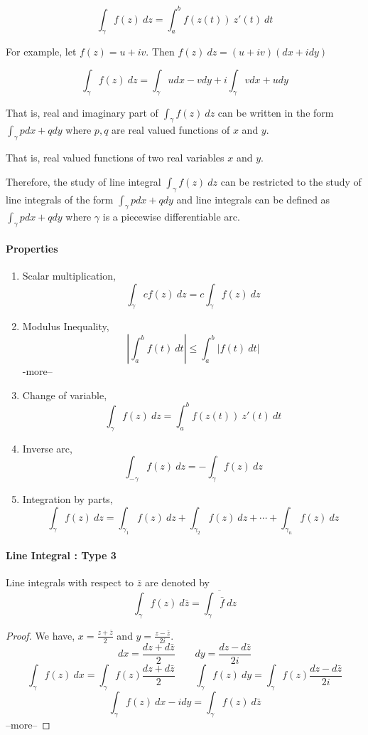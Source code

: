 \[ \int_\gamma f(z)\ dz = \int_a^b f(z(t))\ z'(t)\ dt \]

	For example, let $f(z) = u+iv$.
	Then $f(z)\ dz = (u+iv)(dx+idy)$

\[ \int_\gamma f(z)\ dz = \int_\gamma udx - vdy + i \int_\gamma vdx + udy \]

	That is, real and imaginary part of $\int_\gamma f(z)\ dz$ can be written in the form $\int_\gamma pdx + qdy$ where $p,q$ are real valued functions of $x$ and $y$.
\begin{commentary}
	That is, real valued functions of two real variables $x$ and $y$.
\end{commentary}
	Therefore, the study of line integral $\int_\gamma f(z)\ dz$ can be restricted to the study of line integrals of the form $\int_\gamma pdx+qdy$ and line integrals can be defined as $\int_\gamma pdx+qdy$ where $\gamma$ is a piecewise differentiable arc.

\paragraph{Properties}
\begin{enumerate}
	\item Scalar multiplication,
		\[ \int_\gamma cf(z)\ dz = c\int_\gamma f(z)\ dz \]
	\item Modulus Inequality,
		\[ \left| \int_a^b f(t)\ dt \right| \le \int_a^b |f(t)\ dt| \] -more--
	\item Change of variable,
		\[ \int_\gamma f(z)\ dz = \int_a^b f(z(t))\ z'(t)\ dt \]
	\item Inverse arc,
		\[ \int_{-\gamma} f(z)\ dz = -\int_\gamma f(z)\ dz \]
	\item Integration by parts,
		\[ \int_\gamma f(z)\ dz = \int_{\gamma_1} f(z)\ dz + \int_{\gamma_2} f(z)\ dz+ \cdots + \int_{\gamma_n} f(z)\ dz \]
\end{enumerate}

\paragraph{Line Integral : Type 3}
	Line integrals with respect to $\bar{z}$ are denoted by
\[ \int_\gamma f(z)\ d\bar{z} = \overline{ \int_\gamma \bar{f}\ dz} \]

\begin{proof}
We have,
$x = \frac{z+\bar{z}}{2}$ and $y = \frac{z-\bar{z}}{2i}$. 
\[ dx = \frac{dz+d\bar{z}}{2} \qquad dy = \frac{dz-d\bar{z}}{2i} \]
\[ \int_\gamma f(z)\ dx = \int_\gamma f(z) \frac{dz + d\bar{z}}{2} \qquad \int_\gamma f(z)\ dy = \int_\gamma f(z) \frac{dz-d\bar{z}}{2i} \]
\[ \int_\gamma f(z)\ dx-idy = \int_\gamma f(z)\ d\bar{z} \] --more--
\end{proof}

